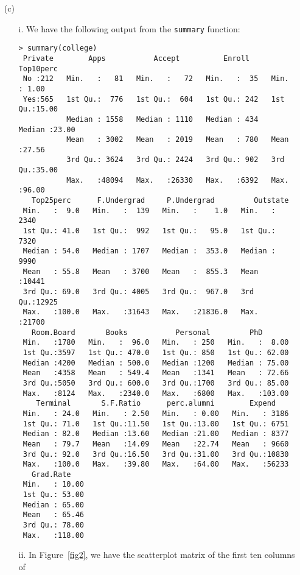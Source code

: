 
\begin{itemize}
    \item[(c)]
    \begin{itemize}
        \item[i.] We have the following output from the \verb|summary| function:
        \scriptsize\begin{verbatim}
> summary(college)
 Private        Apps           Accept          Enroll       Top10perc    
 No :212   Min.   :   81   Min.   :   72   Min.   :  35   Min.   : 1.00  
 Yes:565   1st Qu.:  776   1st Qu.:  604   1st Qu.: 242   1st Qu.:15.00  
           Median : 1558   Median : 1110   Median : 434   Median :23.00  
           Mean   : 3002   Mean   : 2019   Mean   : 780   Mean   :27.56  
           3rd Qu.: 3624   3rd Qu.: 2424   3rd Qu.: 902   3rd Qu.:35.00  
           Max.   :48094   Max.   :26330   Max.   :6392   Max.   :96.00  
   Top25perc      F.Undergrad     P.Undergrad         Outstate    
 Min.   :  9.0   Min.   :  139   Min.   :    1.0   Min.   : 2340  
 1st Qu.: 41.0   1st Qu.:  992   1st Qu.:   95.0   1st Qu.: 7320  
 Median : 54.0   Median : 1707   Median :  353.0   Median : 9990  
 Mean   : 55.8   Mean   : 3700   Mean   :  855.3   Mean   :10441  
 3rd Qu.: 69.0   3rd Qu.: 4005   3rd Qu.:  967.0   3rd Qu.:12925  
 Max.   :100.0   Max.   :31643   Max.   :21836.0   Max.   :21700  
   Room.Board       Books           Personal         PhD        
 Min.   :1780   Min.   :  96.0   Min.   : 250   Min.   :  8.00  
 1st Qu.:3597   1st Qu.: 470.0   1st Qu.: 850   1st Qu.: 62.00  
 Median :4200   Median : 500.0   Median :1200   Median : 75.00  
 Mean   :4358   Mean   : 549.4   Mean   :1341   Mean   : 72.66  
 3rd Qu.:5050   3rd Qu.: 600.0   3rd Qu.:1700   3rd Qu.: 85.00  
 Max.   :8124   Max.   :2340.0   Max.   :6800   Max.   :103.00  
    Terminal       S.F.Ratio      perc.alumni        Expend     
 Min.   : 24.0   Min.   : 2.50   Min.   : 0.00   Min.   : 3186  
 1st Qu.: 71.0   1st Qu.:11.50   1st Qu.:13.00   1st Qu.: 6751  
 Median : 82.0   Median :13.60   Median :21.00   Median : 8377  
 Mean   : 79.7   Mean   :14.09   Mean   :22.74   Mean   : 9660  
 3rd Qu.: 92.0   3rd Qu.:16.50   3rd Qu.:31.00   3rd Qu.:10830  
 Max.   :100.0   Max.   :39.80   Max.   :64.00   Max.   :56233  
   Grad.Rate     
 Min.   : 10.00  
 1st Qu.: 53.00  
 Median : 65.00  
 Mean   : 65.46  
 3rd Qu.: 78.00  
 Max.   :118.00 
        \end{verbatim}\normalsize
        \item[ii.] In Figure~\ref{fig2}, we have the scatterplot matrix of the first ten columns of 

\end{itemize}
\end{itemize}
